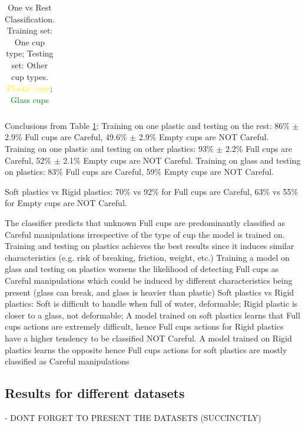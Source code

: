 \begin{table}
{\begin{tabular}{l l c c c c c c}
\midrule %
\midrule %
\end{tabular}
}
\caption{One vs Rest Classification. Training set: One cup type; Testing set: Other cup types. \textcolor{Yellow}{Plastic cups}; \textcolor{Green}{Glass cups}}
\label{tab:one_vs_all} 
\end{table}

Conclusions from Table \ref{tab:one_vs_all}:
Training on one plastic and testing on the rest: 86\% $\pm$ 2.9\% Full cups are Careful, 49.6\% $\pm$ 2.9\% Empty cups are NOT Careful. Training on one plastic and testing on other plastics: 93\% $\pm$ 2.2\% Full cups are Careful, 52\% $\pm$ 2.1\% Empty cups are NOT Careful. Training on glass and testing on plastics: 83\% Full cups are Careful,	59\% Empty cups are NOT Careful.

Soft plastics vs Rigid plastics: 70\% vs 92\% for Full cups are Careful, 63\% vs 55\% for Empty cups are NOT Careful. 

The classifier predicts that unknown Full cups are predominantly classified as Careful manipulations irrespective of the type of cup the model is trained on.
Training and testing on plastics achieves the best results since it induces similar characteristics (e.g. risk of breaking, friction, weight, etc.) 
Training a model on glass and testing on plastics worsens the likelihood of detecting Full cups as Careful manipulations which could be induced by different characteristics being present (glass can break, and glass is heavier than plastic)
Soft plastics vs Rigid plastics: 		
Soft is difficult to handle when full of water, deformable;
Rigid plastic is closer to a glass, not deformable; 
A model trained on soft plastics learns that Full cups actions are extremely difficult, hence Full cups actions for Rigid plastics have a higher tendency to be classified NOT Careful.
A model trained on Rigid plastics learns the opposite hence Full cups actions for soft plastics are mostly classified as Careful manipulations

\subsection{Results for different datasets}

- DONT FORGET TO PRESENT THE DATASETS (SUCCINCTLY) \cite{xompero_corsmal_2020} 

